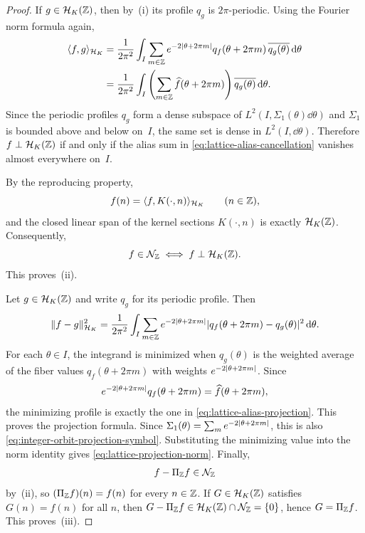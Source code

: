 \begin{proof}
If $g\in\mathcal H_K(\mathbb{Z})$, then by~(i) its profile $q_g$ is
$2\pi$-periodic.  Using the Fourier norm formula again,
\begin{align*}
\langle f,g\rangle_{\mathcal H_K}
&=
\frac{1}{2\pi^2}\int_I
\sum_{m\in\mathbb{Z}}e^{-2\lvert \theta+2\pi m\rvert}q_f(\theta+2\pi m)\,
\overline{q_g(\theta)}\,\mathrm{d}\theta \\
&=
\frac{1}{2\pi^2}\int_I
\left(
\sum_{m\in\mathbb{Z}}\widehat f(\theta+2\pi m)
\right)\overline{q_g(\theta)}\,\mathrm{d}\theta.
\end{align*}
Since the periodic profiles $q_g$ form a dense subspace of
$L^2(I,\Sigma_1(\theta)\dd\theta)$ and $\Sigma_1$ is bounded above and below
on~$I$, the same set is dense in $L^2(I,\dd\theta)$.  Therefore
$f\perp\mathcal H_K(\mathbb{Z})$ if and only if the alias sum in
\eqref{eq:lattice-alias-cancellation} vanishes almost everywhere on~$I$.

By the reproducing property,
\[
f(n)=\langle f,K(\cdot,n)\rangle_{\mathcal H_K}
\qquad(n\in\mathbb{Z}),
\]
and the closed linear span of the kernel sections $K(\cdot,n)$ is
exactly $\mathcal H_K(\mathbb{Z})$.  Consequently,
\[
f\in\mathcal N_{\mathbb{Z}}
\iff
f\perp\mathcal H_K(\mathbb{Z}).
\]
This proves~(ii).

Let $g\in\mathcal H_K(\mathbb{Z})$ and write $q_g$ for its periodic profile.
Then
\[
\|f-g\|_{\mathcal H_K}^2
=\frac{1}{2\pi^2}\int_I
\sum_{m\in\mathbb{Z}}e^{-2\lvert \theta+2\pi m\rvert}
\lvert q_f(\theta+2\pi m)-q_g(\theta)\rvert^2\,\mathrm{d}\theta.
\]
For each $\theta\in I$, the integrand is minimized when $q_g(\theta)$ is the
weighted average of the fiber values $q_f(\theta+2\pi m)$ with weights
$e^{-2\lvert \theta+2\pi m\rvert}$.  Since
\[
e^{-2\lvert \theta+2\pi m\rvert}q_f(\theta+2\pi m)
=\widehat f(\theta+2\pi m),
\]
the minimizing profile is exactly the one in
\eqref{eq:lattice-alias-projection}.  This proves the projection formula.
Since \(\Sigma_1(\theta)=\sum_m e^{-2\lvert \theta+2\pi m\rvert}\), this is also
\eqref{eq:integer-orbit-projection-symbol}.
Substituting the minimizing value into the norm identity gives
\eqref{eq:lattice-projection-norm}.  Finally,
\[
f-\Pi_{\mathbb{Z}}f\in\mathcal N_{\mathbb{Z}}
\]
by~(ii), so $(\Pi_{\mathbb{Z}}f)(n)=f(n)$ for every $n\in\mathbb{Z}$.  If
$G\in\mathcal H_K(\mathbb{Z})$ satisfies $G(n)=f(n)$ for all $n$, then
$G-\Pi_{\mathbb{Z}}f\in\mathcal H_K(\mathbb{Z})\cap\mathcal N_{\mathbb{Z}}=\{0\}$, hence
$G=\Pi_{\mathbb{Z}}f$.  This proves~(iii).


\end{proof}
